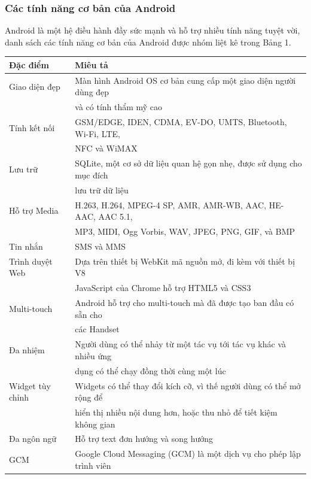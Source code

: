 \documentclass[a4paper]{article}
\begin{document}
\subsubsection{Các tính năng cơ bản của Android}
Android là một hệ điều hành đầy sức mạnh và hỗ trợ nhiều tính năng tuyệt vời, danh sách các tính năng cơ bản của Android được nhóm liệt kê trong Bảng 1.
\begin{table}[h]
\centering
\begin{tabular}{|l|l|}
\hline
\rowcolor[HTML]{C0C0C0} 
\textbf{Đặc điểm}& \textbf{Miêu tả} \\
\hline
Giao diện đẹp 	 & Màn hình Android OS cơ bản cung cấp một giao diện người dùng đẹp \\
			  	 & và có tính thẩm mỹ cao \\ \hline
Tính kết nối  	 & GSM/EDGE, IDEN, CDMA, EV-DO, UMTS, Bluetooth, Wi-Fi, LTE, \\ 
			  	 & NFC và WiMAX \\ 
\hline
Lưu trữ 	  	 & SQLite, một cơ sở dữ liệu quan hệ gọn nhẹ, được sử dụng cho mục đích \\ 
			  	 & lưu trữ dữ liệu \\
\hline
Hỗ trợ Media 	 & H.263, H.264, MPEG-4 SP, AMR, AMR-WB, AAC, HE-AAC, AAC 5.1, \\ 
			  	 & MP3, MIDI, Ogg Vorbis, WAV, JPEG, PNG, GIF, và BMP \\
\hline
Tin nhắn 	  	 & SMS và MMS \\
\hline
Trình duyệt Web  & Dựa trên thiết bị WebKit mã nguồn mở, đi kèm với thiết bị V8  \\ 
				 & JavaScript của Chrome hỗ trợ HTML5 và CSS3 \\
\hline
Multi-touch 	 & Android hỗ trợ cho multi-touch mà đã được tạo ban đầu có sẵn cho \\ 
				 & các Handset \\
 \hline
Đa nhiệm 		 & Người dùng có thể nhảy từ một tác vụ tới tác vụ khác và nhiều ứng\\ 
				 & dụng có thể chạy đồng thời cùng một lúc \\
\hline
Widget tùy chỉnh & Widgets có thể thay đổi kích cỡ, vì thế người dùng có thể mở rộng để\\ 
				 & hiển thị nhiều nội dung hơn, hoặc thu nhỏ để tiết kiệm không gian\\
\hline
Đa ngôn ngữ 	 & Hỗ trợ text đơn hướng và song hướng \\
\hline
GCM 			 & Google Cloud Messaging (GCM) là một dịch vụ cho phép lập trình viên\\ 

\end{tabular}
\end{table}
\end{document}
